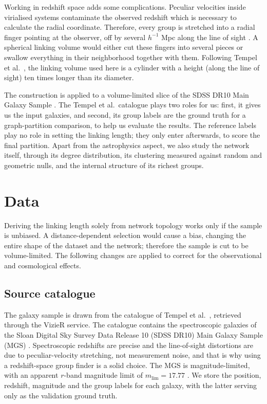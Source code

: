 \documentclass[9pt,a4paper,twocolumn,twoside]{rho-class/rho}
\begin{document}
Working in redshift space adds some complications. Peculiar velocities inside
virialised systems contaminate the observed redshift which is necessary to calculate
the radial coordinate. Therefore, every group is stretched into a radial finger
pointing at the observer, off by several $h^{-1}$ Mpc along
the line of sight \cite{jackson1972}. A spherical linking volume would either cut
these fingers into several pieces or swallow everything in their neighborhood together with them.
Following Tempel et al.\ \cite{tempel2014}, the linking volume used here is a
cylinder with a height (along the line of sight) ten times longer than its diameter.

The construction is applied to a volume-limited slice of the SDSS DR10 Main
Galaxy Sample \cite{ahn2014}. The Tempel et al.\ catalogue \cite{tempel2014}
plays two roles for us: first, it gives us the input galaxies, and second, its group labels
are the ground truth for a graph-partition comparison, to help us evaluate the results.
The reference labels play no role in setting the
linking length; they only enter afterwards, to score the final partition.
Apart from the astrophysics aspect, we also study the network itself,
through its degree
distribution, its clustering measured against random and geometric nulls,
and the internal structure of its richest groups.

\section{Data}

Deriving the linking length solely from network topology works only if the
sample is unbiased. A distance-dependent selection would cause a bias, changing
the entire shape of the dataset and the network; therefore the sample is cut to
be volume-limited. The following changes are applied to correct for the
observational and cosmological effects.

\subsection{Source catalogue}

The galaxy sample is drawn from the catalogue of Tempel et al.\
\cite{tempel2014}, retrieved through the VizieR service. The catalogue contains
the spectroscopic galaxies of the Sloan Digital Sky Survey Data Release 10
(SDSS DR10) Main Galaxy Sample (MGS) \cite{ahn2014}. Spectroscopic redshifts
are precise and the line-of-sight distortions are due to peculiar-velocity
stretching, not measurement noise, and that is why using a redshift-space group
finder is a solid choice. The MGS is magnitude-limited, with an apparent
$r$-band magnitude limit of $m_{\mathrm{lim}} = 17.77$ \cite{tempel2014}. We store the position,
redshift, magnitude and the group labels for each galaxy, with the latter serving
only as the validation ground truth.
\end{document}
